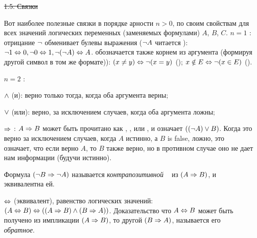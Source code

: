 \st{1.5. Связки}


 Вот наиболее полезные связки в порядке арности $n > 0$, по своим свойствам для всех значений логических переменных (заменяемых формулами) $A$, $B$, $C$.
\smallskip
\noindent $n=1$ : отрицание $\neg$ обменивает булевы выражения ($\neg A$ читается ): 
$\neg1\Leftrightarrow0, \neg0\Leftrightarrow1, \neg(\neg A)\Leftrightarrow A$. обозначается также корнем из аргумента (формируя другой символ в том же формате)):   $(x\not=y)\Leftrightarrow\neg(x=y)$ (); $x\notin E\Leftrightarrow\neg(x\in E)$ (). 



\smallbreak
\noindent $n=2$ :

$\wedge$ (и): верно только тогда, когда оба аргумента верны;

$\vee$ (или): верно, за исключением случаев, когда оба аргумента ложны;

$\Rightarrow$ : $A\Rightarrow B$ может быть прочитано как , , или , и означает $((\neg A) \vee B)$. Когда это верно за исключением случаев, когда $A$ истинно, а $B$ is false, ложно, это означает, что если верно $A$, то $B$ также верно, но в противном случае оно не дает нам информации (будучи истинно).

Формула $(\neg B\Rightarrow \neg A)$ называется {\it контрапозитивной \ } из $(A\Rightarrow B)$, и эквивалентна ей.

$\Leftrightarrow$ (эквивалент), равенство логических значений: $(A\Leftrightarrow B)\Leftrightarrow((A\Rightarrow B)\wedge (B\Rightarrow A))$. Доказательство что $A\Leftrightarrow B$ может быть получено из импликации $(A\Rightarrow B)$, то другой $(B\Rightarrow A)$, называется его {\it обратное}.


